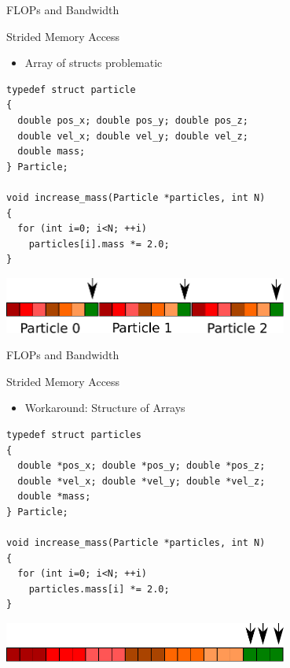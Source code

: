 
\begin{frame}[fragile]{FLOPs and Bandwidth}

\begin{block}{Strided Memory Access}
  \begin{itemize}
   \item Array of structs problematic
  \end{itemize}
  \begin{lstlisting}  
typedef struct particle
{
  double pos_x; double pos_y; double pos_z;
  double vel_x; double vel_y; double vel_z;
  double mass;
} Particle;
  
void increase_mass(Particle *particles, int N)
{
  for (int i=0; i<N; ++i)
    particles[i].mass *= 2.0;
}  
  \end{lstlisting}
\end{block}
   \begin{center} \includegraphics[width=0.7\textwidth]{figures/particles-strided} \end{center}

\end{frame}


\begin{frame}[fragile]{FLOPs and Bandwidth}

\begin{block}{Strided Memory Access}
  \begin{itemize}
   \item Workaround: Structure of Arrays
  \end{itemize}
  \begin{lstlisting}  
typedef struct particles
{
  double *pos_x; double *pos_y; double *pos_z;
  double *vel_x; double *vel_y; double *vel_z;
  double *mass;
} Particle;
  
void increase_mass(Particle *particles, int N)
{
  for (int i=0; i<N; ++i)
    particles.mass[i] *= 2.0;
}  
  \end{lstlisting}
\end{block}

   \begin{center} \includegraphics[width=0.7\textwidth]{figures/particles-contiguous} \end{center} \vspace*{0.5cm}

\end{frame}


